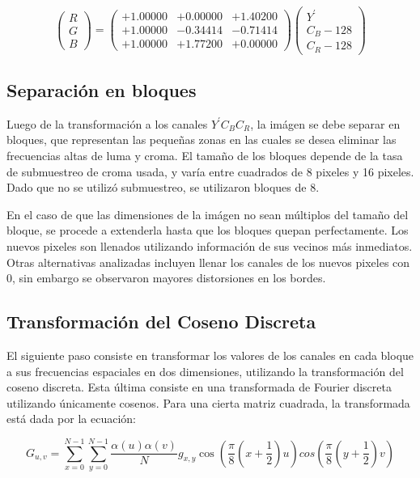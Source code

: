 \documentclass[%
	final,
	reprint,
	notitlepage,
	narroweqnarray,
	inline,
	twoside,
	invited
	]{ieee}
\begin{document}
\[
 \begin{pmatrix} R \\ G \\ B \end{pmatrix} = \begin{pmatrix} +1.00000 & +0.00000 & +1.40200 \\
+1.00000 & -0.34414 & -0.71414 \\
+1.00000& +1.77200 & +0.00000  \end{pmatrix}  \begin{pmatrix}Y^{'} \\ C_B - 128\\ C_R - 128\end{pmatrix}
\]


\subsection{Separación en bloques}

\par Luego de la transformación a los canales $Y^{'}C_BC_R$, la imágen se debe separar en bloques, que representan 
las pequeñas zonas en las cuales se desea eliminar las frecuencias altas de luma y croma. El tamaño de los bloques 
depende de la tasa de submuestreo de croma usada, y varía entre cuadrados de 8 pixeles y 16 pixeles. Dado que 
no se utilizó submuestreo, se utilizaron bloques de 8.
\par En el caso de que las dimensiones de la imágen no sean múltiplos del tamaño del bloque, se procede a extenderla 
hasta que los bloques quepan perfectamente. Los nuevos pixeles son llenados utilizando información de sus vecinos más 
inmediatos. Otras alternativas analizadas incluyen llenar los canales de los nuevos pixeles con 0, sin embargo se observaron 
mayores distorsiones en los bordes.

\subsection{Transformación del Coseno Discreta}

El siguiente paso consiste en transformar los valores de los canales en cada bloque a sus 
frecuencias espaciales en dos dimensiones, 
utilizando la transformación del coseno discreta. Esta última consiste en una transformada 
de Fourier discreta utilizando únicamente cosenos. Para una cierta matriz cuadrada, la transformada está 
dada por la ecuación:

\begin{equation}
	G_{u, v} = \sum^{N-1}_{x=0}\sum^{N-1}_{y=0}\frac{\alpha(u)\alpha(v)}{N}g_{x, y}\cos(\frac{\pi}{8}(x+\frac{1}{2})u)cos(\frac{\pi}{8}(y+\frac{1}{2})v)
\end{equation}
\end{document}
